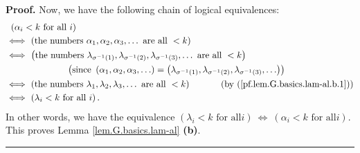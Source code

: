 \documentclass[numbers=enddot,12pt,final,onecolumn,notitlepage]{scrartcl}%
\theoremstyle{definition}
\newenvironment{proof}[1][Proof]{\noindent\textbf{#1.} }{\ \rule{0.5em}{0.5em}}
\newenvironment{verlong}{}{}
\begin{document}
\begin{verlong}
\begin{proof}
Now, we have the following chain of logical equivalences:%
\begin{align*}
&  \ \left(  \alpha_{i}<k\text{ for all }i\right) \\
&  \Longleftrightarrow\ \left(  \text{the numbers }\alpha_{1},\alpha
_{2},\alpha_{3},\ldots\text{ are all }<k\right) \\
&  \Longleftrightarrow\ \left(  \text{the numbers }\lambda_{\sigma^{-1}\left(
1\right)  },\lambda_{\sigma^{-1}\left(  2\right)  },\lambda_{\sigma
^{-1}\left(  3\right)  },\ldots\text{ are all }<k\right) \\
&  \ \ \ \ \ \ \ \ \ \ \ \ \ \ \ \ \ \ \ \ \left(  \text{since }\left(
\alpha_{1},\alpha_{2},\alpha_{3},\ldots\right)  =\left(  \lambda_{\sigma
^{-1}\left(  1\right)  },\lambda_{\sigma^{-1}\left(  2\right)  }%
,\lambda_{\sigma^{-1}\left(  3\right)  },\ldots\right)  \right) \\
&  \Longleftrightarrow\ \left(  \text{the numbers }\lambda_{1},\lambda
_{2},\lambda_{3},\ldots\text{ are all }<k\right)  \ \ \ \ \ \ \ \ \ \ \left(
\text{by (\ref{pf.lem.G.basics.lam-al.b.1})}\right) \\
&  \Longleftrightarrow\ \left(  \lambda_{i}<k\text{ for all }i\right)  .
\end{align*}
In other words, we have the equivalence $\left(  \lambda_{i}<k\text{ for all
}i\right)  \ \Longleftrightarrow\ \left(  \alpha_{i}<k\text{ for all
}i\right)  $. This proves Lemma \ref{lem.G.basics.lam-al} \textbf{(b)}.
\end{proof}


\end{verlong}
\end{document}
